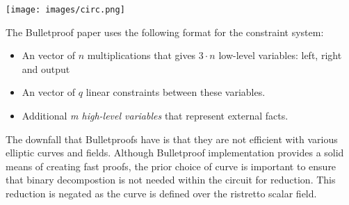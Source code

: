 \documentclass{article}
\begin{document}
\begin{center}
\texttt{[image: images/circ.png]}
\end{center}
The Bulletproof paper uses the following format for the constraint system: 
\begin{itemize}
    \item  An vector of $n$ multiplications that gives $3 \cdot n$ low-level variables: left, right and output
    \item An vector of $q$ linear constraints between these variables.
    \item Additional \emph{m high-level variables} that represent external facts.
\end{itemize} 
The downfall that Bulletproofs have is that they are not efficient with various elliptic curves and fields. Although Bulletproof implementation provides a solid means of creating fast proofs, the prior choice of curve is important to ensure that binary decompostion is not needed within the circuit for reduction. This reduction is negated as the curve is defined over the ristretto scalar field.  
\end{document}
